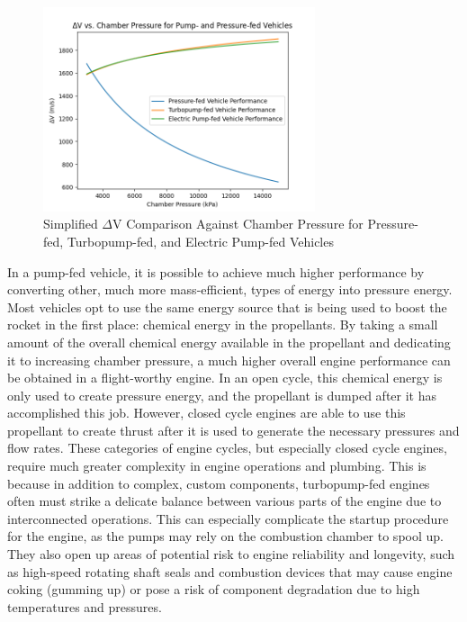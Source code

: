 \documentclass[12pt, letterpaper]{article}
\begin{document}
\begin{figure}[t]
    \centering
    \includegraphics[width=8cm]{deltaV_Pressure_V_Pump.png}
    \caption{Simplified $\Delta$V Comparison Against Chamber Pressure for Pressure-fed, Turbopump-fed, and Electric Pump-fed Vehicles}
\end{figure}

In a pump-fed vehicle, it is possible to achieve much higher performance by converting other, much more mass-efficient, types of energy into pressure energy. Most vehicles opt to use the same energy source that is being used to boost the rocket in the first place: chemical energy in the propellants. By taking a small amount of the overall chemical energy available in the propellant and dedicating it to increasing chamber pressure, a much higher overall engine performance can be obtained in a flight-worthy engine. In an open cycle, this chemical energy is only used to create pressure energy, and the propellant is dumped after it has accomplished this job. However, closed cycle engines are able to use this propellant to create thrust after it is used to generate the necessary pressures and flow rates. These categories of engine cycles, but especially closed cycle engines, require much greater complexity in engine operations and plumbing. This is because in addition to complex, custom components, turbopump-fed engines often must strike a delicate balance between various parts of the engine due to interconnected operations. This can especially complicate the startup procedure for the engine, as the pumps may rely on the combustion chamber to spool up. They also open up areas of potential risk to engine reliability and longevity, such as high-speed rotating shaft seals and combustion devices that may cause engine coking (gumming up) or pose a risk of component degradation due to high temperatures and pressures.
\end{document}
